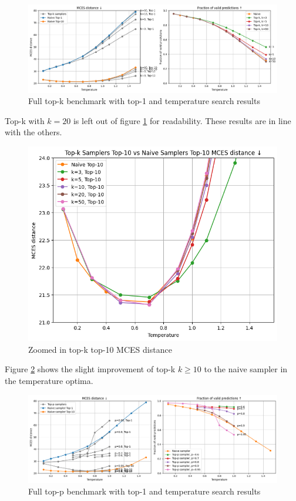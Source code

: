 \begin{figure}[h]
    \centering
    \includegraphics[width=\linewidth]{figures/appendix/samplers/top-k_vs_naive.png}
    \caption{Full top-k benchmark with top-1 and temperature search results}
    \label{fig:top-k_appendix}
\end{figure}

Top-k with $k=20$ is left out of figure \ref{fig:top-k_appendix} for readability. These results are in line with the others.

\begin{figure}[h]
    \centering
    \includegraphics[width=0.6\linewidth]{figures/appendix/samplers/top-k_vs_naive_top-10.png}
    \caption{Zoomed in top-k top-10 MCES distance}
    \label{fig:top-k_zoomed_appendix}
\end{figure}

Figure \ref{fig:top-k_zoomed_appendix} shows the slight improvement of top-k $k\geq 10$ to the naive sampler in the temperature optima.

\begin{figure}[h]
    \centering
    \includegraphics[width=\linewidth]{figures/appendix/samplers/top-p_vs_naive.png}
    \caption{Full top-p benchmark with top-1 and temperature search results}
    \label{fig:top-p_appendix}
\end{figure}

